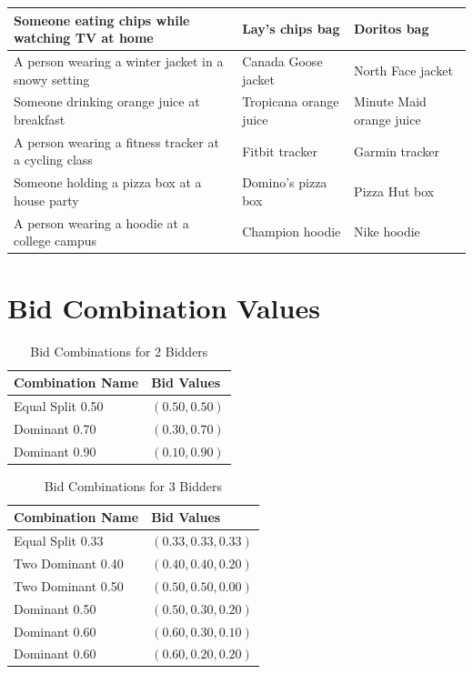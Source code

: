 \documentclass[format=acmsmall, review=false]{acmart}
\begin{document}
\begin{table}[H]
\begin{tabular}{>{\raggedright\arraybackslash}p{6cm} 
                >{\raggedright\arraybackslash}p{3cm} 
                >{\raggedright\arraybackslash}p{3cm}}
Someone eating chips while watching TV at home & Lay's chips bag & Doritos bag \\ \hline
A person wearing a winter jacket in a snowy setting & Canada Goose jacket & North Face jacket \\ \hline
Someone drinking orange juice at breakfast & Tropicana orange juice & Minute Maid orange juice \\ \hline
A person wearing a fitness tracker at a cycling class & Fitbit tracker & Garmin tracker \\ \hline
Someone holding a pizza box at a house party & Domino's pizza box & Pizza Hut box \\ \hline
A person wearing a hoodie at a college campus & Champion hoodie & Nike hoodie \\
\bottomrule
\end{tabular}
\label{tab:prompts_2_agents_competitive}
\end{table}
\renewcommand{\arraystretch}{1.0}



\newpage

\section{Bid Combination Values}
\label{app:bid-dist}


\begin{table}[H]
\centering
\captionsetup{skip=2pt}
\caption{Bid Combinations for 2 Bidders}
\begin{tabular}{ll}
\hline
\textbf{Combination Name} & \textbf{Bid Values} \\
\hline
Equal Split 0.50 & $(0.50, 0.50)$ \\
Dominant 0.70 & $(0.30, 0.70)$ \\
Dominant 0.90 & $(0.10, 0.90)$ \\
\hline
\end{tabular}
\label{tab:bids_2}
\end{table}

\begin{table}[H]
\centering
\captionsetup{skip=2pt}
\caption{Bid Combinations for 3 Bidders}
\begin{tabular}{ll}
\hline
\textbf{Combination Name} & \textbf{Bid Values} \\
\hline
Equal Split 0.33 & $(0.33, 0.33, 0.33)$ \\
Two Dominant 0.40 & $(0.40, 0.40, 0.20)$ \\
Two Dominant 0.50 & $(0.50, 0.50, 0.00)$ \\
Dominant 0.50 & $(0.50, 0.30, 0.20)$ \\
Dominant 0.60 & $(0.60, 0.30, 0.10)$ \\
Dominant 0.60 & $(0.60, 0.20, 0.20)$ \\
\hline
\end{tabular}
\label{tab:bids_3}
\end{table}
\end{document}
